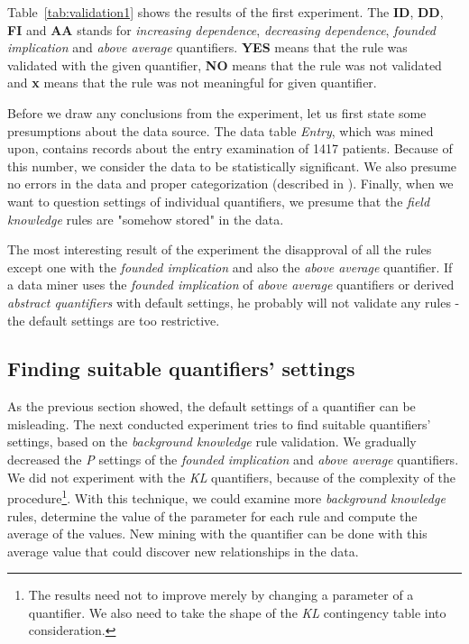\documentclass{llncs}
\begin{document}
Table~\ref{tab:validation1} shows the results of the first experiment. The \textbf{ID},
\textbf{DD}, \textbf{FI} and \textbf{AA} stands for \emph{increasing dependence}, 
\emph{decreasing dependence}, \emph{founded implication} and \emph{above average}
quantifiers. \textbf{YES} means that the rule was validated with the given quantifier,
\textbf{NO} means that the rule was not validated and \textbf{x} means that the
rule was not meaningful for given quantifier.

Before we draw any conclusions from the experiment, let us first state some 
presumptions about the data source. The data table \emph{Entry}, which was mined 
upon, contains records about the entry examination of 1417 patients. Because of
this number, we consider the data to be statistically significant. We also
presume no errors in the data and proper categorization (described in \cite{Diplomka}). 
Finally, when we want to question settings of individual quantifiers, we
presume that the \emph{field knowledge} rules are "somehow stored" in the data. 

The most interesting result of the experiment the disapproval of all the rules except
one with the \emph{founded implication} and also the \emph{above average}
quantifier. If a data miner uses the \emph{founded implication} of \emph{above
average} quantifiers or derived \emph{abstract quantifiers} with default settings,
he probably will not validate any rules - the default settings are too restrictive.

\subsection{Finding suitable quantifiers' settings}
As the previous section showed, the default settings of a quantifier can be
misleading. The next conducted experiment tries to find suitable quantifiers'
settings, based on the \emph{background knowledge} rule validation. We gradually
decreased the \emph{P} settings of the \emph{founded implication} and
\emph{above average} quantifiers. We did not experiment with the
\emph{KL} quantifiers, because of the complexity of the procedure\footnote{The 
results need not to improve merely by changing a parameter of a quantifier. 
We also need to take the shape of the \emph{KL} contingency table into consideration.}.
With this technique, we could examine more \emph{background knowledge} rules,
determine the value of the parameter for each rule and compute the average
of the values. New mining with the quantifier can be done with this average
value that could discover new relationships in the data.
\end{document}
